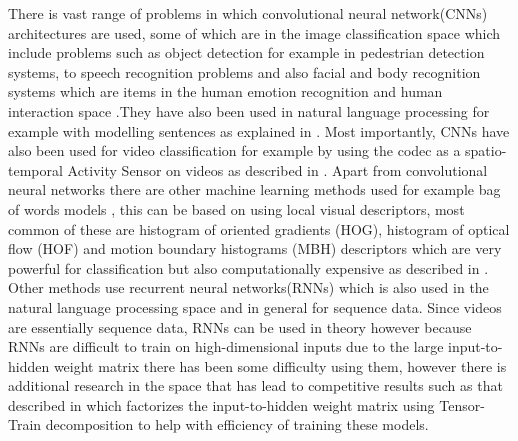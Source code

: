 \documentclass[10pt,phd,a4paper,oneside]{article}
\begin{document}
    There is vast range of problems in which convolutional neural network(CNNs) architectures are used, some of which are in the image classification space which include problems such as object detection for example in pedestrian detection \citep{TomeD2016DCNN} systems, to speech  recognition problems and also facial and body recognition systems which are items in the human emotion recognition and human interaction space \cite{knyazev2017convolutional} .They have also been used in natural language processing for example with modelling sentences as explained in \cite{Kalchbrenner_2014}.
    Most importantly, CNNs have also been used for video classification for example by using the codec as a spatio-temporal Activity Sensor on videos as described in \citep{ChadhaA2017VCWC}. Apart from convolutional neural networks there are other machine learning methods used for example bag of words models \citep{10.1007978-3-642-28493-9_34}, this can be based on using local visual descriptors, most common of these are histogram of oriented gradients (HOG), histogram of optical flow (HOF) and motion boundary histograms (MBH) descriptors which are very powerful for classification but also computationally expensive as described in \citep{Uijlings2015}. Other methods use recurrent neural networks(RNNs) which is also used in the natural language processing space and in general for sequence data. Since videos are essentially sequence data, RNNs can be used in theory however because RNNs are difficult to train on high-dimensional inputs due to the large input-to-hidden weight matrix there has been some difficulty using them, however there is additional research in the space that has lead to competitive results such as that described in \citep{yang2017tensortrain} which factorizes the input-to-hidden weight matrix using Tensor-Train decomposition to help with efficiency of training these models.
\end{document}
